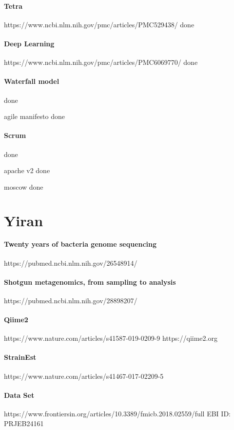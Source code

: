 \documentclass{article}
\begin{document}
\paragraph{Tetra}
https://www.ncbi.nlm.nih.gov/pmc/articles/PMC529438/
done

\paragraph{Deep Learning}
https://www.ncbi.nlm.nih.gov/pmc/articles/PMC6069770/
done

\paragraph{Waterfall model}
done

\par {agile manifesto}
done

\paragraph{Scrum}
done

\par {apache v2}
done

\par moscow
done



\section*{Yiran}
\paragraph{Twenty years of bacteria genome sequencing}
https://pubmed.ncbi.nlm.nih.gov/26548914/

\paragraph{Shotgun metagenomics, from sampling to analysis}
https://pubmed.ncbi.nlm.nih.gov/28898207/

\paragraph{Qiime2}
https://www.nature.com/articles/s41587-019-0209-9
https://qiime2.org

\paragraph{StrainEst}
https://www.nature.com/articles/s41467-017-02209-5

\paragraph{Data Set}
https://www.frontiersin.org/articles/10.3389/fmicb.2018.02559/full
EBI ID: PRJEB24161
\end{document}
